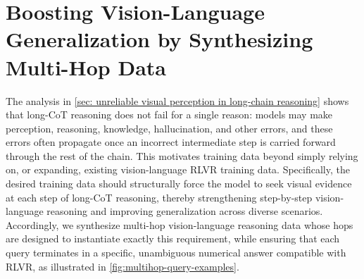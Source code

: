 
















































































\section{Boosting Vision-Language Generalization by Synthesizing Multi-Hop Data}
\label{sec: method}

The analysis in \cref{sec: unreliable visual perception in long-chain reasoning} shows that long-CoT reasoning does not fail for a single reason: models may make perception, reasoning, knowledge, hallucination, and other errors, and these errors often propagate once an incorrect intermediate step is carried forward through the rest of the chain.
This motivates training data beyond simply relying on, or expanding, existing vision-language RLVR training data. Specifically, the desired training data should structurally force the model to seek visual evidence at each step of long-CoT reasoning, thereby strengthening step-by-step vision-language reasoning and improving generalization across diverse scenarios.
Accordingly, we synthesize multi-hop vision-language reasoning data whose hops are designed to instantiate exactly this requirement, while ensuring that each query terminates in a specific, unambiguous numerical answer compatible with RLVR, as illustrated in \cref{fig:multihop-query-examples}.

